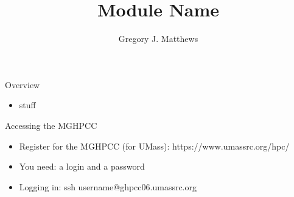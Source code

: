 

\title{Module Name}
\newcommand{\ModuleShortname}{shortName}
\author{Gregory J. Matthews}
\newcommand{\LicenseText}{Made available under the Creative Commons Attribution-ShareAlike 3.0 Unported License: http://creativecommons.org/licenses/by-sa/3.0/deed.en\textunderscore US }
\newcommand{\Instructor}{}
\newcommand{\Course}{}






\begin{frame}[plain]
	\titlepage
\end{frame}


\begin{frame}{Overview}
\begin{itemize}
\item stuff
\end{itemize}
\end{frame}


\begin{frame}{Accessing the MGHPCC}
\begin{itemize}
\item Register for the MGHPCC (for UMass): https://www.umassrc.org/hpc/
\item You need: a login and a password
\item Logging in: ssh username@ghpcc06.umassrc.org
\end{itemize}
\end{frame}


